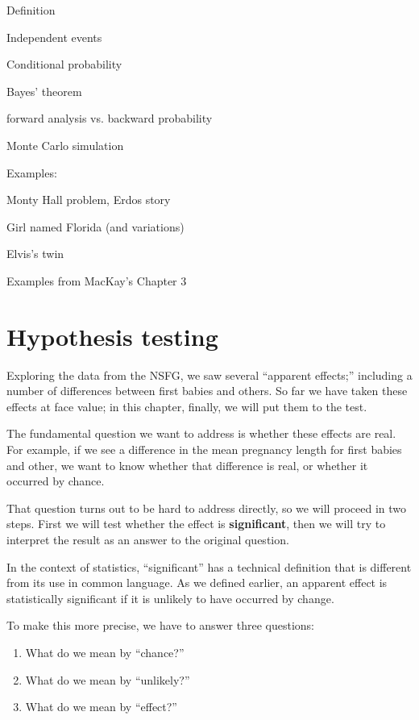 \documentclass[10pt]{book}
\begin{document}
Definition

Independent events

Conditional probability

Bayes' theorem

    forward analysis vs. backward probability

Monte Carlo simulation

Examples:

Monty Hall problem, Erdos story

Girl named Florida (and variations)

Elvis's twin

Examples from MacKay's Chapter 3


\chapter{Hypothesis testing}

Exploring the data from the NSFG, we saw several ``apparent effects;''
including a number of differences between first babies and others.
So far we have taken these effects at face value; in this chapter,
finally, we will put them to the test.

The fundamental question we want to address is whether these effects
are real.  For example, if we see a difference in the mean pregnancy
length for first babies and other, we want to know whether that
difference is real, or whether it occurred by chance.

That question turns out to be hard to address directly, so we will
proceed in two steps.  First we will test whether the effect is {\bf
  significant}, then we will try to interpret the result
  as an answer to the original question.

In the context of statistics, ``significant'' has a technical
definition that is different from its use in common language.
As we defined earlier, an apparent effect is statistically
significant if it is unlikely to have occurred by change.

To make this more precise, we have to answer three questions:

\begin{enumerate}

\item What do we mean by ``chance?''

\item What do we mean by ``unlikely?''

\item What do we mean by ``effect?''

\end{enumerate}
\end{document}
